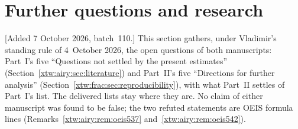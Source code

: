 \documentclass[11pt]{article}
\theoremstyle{remark}\newtheorem{remark}[theorem]{Remark}
\begin{document}
\section{Further questions and research}\label{xtw:sec:further}

[Added 7 October 2026, batch~110.] This section gathers, under Vladimir's
standing rule of 4~October 2026, the open questions of both manuscripts:
Part~I's five ``Questions not settled by the present estimates''
(Section~\ref{xtw:airy:sec:literature}) and Part~II's five ``Directions for
further analysis'' (Section~\ref{xtw:frac:sec:reproducibility}), with what
Part~II settles of Part~I's list. The delivered lists stay where they are.
No claim of either manuscript was found to be false; the two refuted
statements are OEIS formula lines (Remarks~\ref{xtw:airy:rem:oeis537}
and~\ref{xtw:airy:rem:oeis542}).
\end{document}
